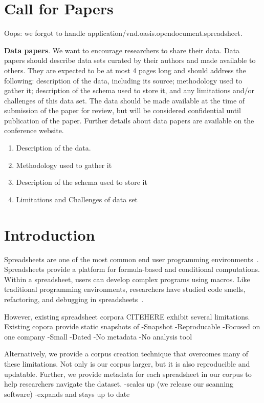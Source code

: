 \documentclass[conference]{IEEEtran}
\begin{document}
\section{Call for Papers}

Oops: we forgot to handle application/vnd.oasis.opendocument.spreadsheet.

\textbf{Data papers}. We want to encourage researchers to share their data. Data papers should describe data sets curated by their authors and made available to others. They are expected to be at most 4 pages long and should address the following: description of the data, including its source; methodology used to gather it; description of the schema used to store it, and any limitations and/or challenges of this data set. The data should be made available at the time of submission of the paper for review, but will be considered confidential until publication of the paper. Further details about data papers are available on the conference website. 

\begin{enumerate}
\item Description of the data.
\item Methodology used to gather it
\item Description of the schema used to store it
\item Limitations and Challenges of data set
\end{enumerate}

\section{Introduction}
Spreadsheets are one of the most common end user programming environments~\cite{Scaffidi2005}. Spreadsheets provide a platform for formula-based and conditional computations. Within a spreadsheet, users can develop complex programs using macros. Like traditional programming environments, researchers have studied code smells, refactoring, and debugging in spreadsheets~\cite{Pinzger2012,Badame2012,Abraham2007}.

However, existing spreadsheet corpora CITEHERE exhibit several limitations. Existing copora provide static snapshots of  
-Snapshot
-Reproducable
-Focused on one company
-Small
-Dated
-No metadata
-No analysis tool

Alternatively, we provide a corpus creation technique that overcomes many of these limitations. Not only is our corpus larger, but it is also reproducible and updatable. Further, we provide metadata for each spreadsheet in our corpus to help researchers navigate the dataset.
-scales up (we release our scanning software)
-expands and stays up to date
\end{document}
